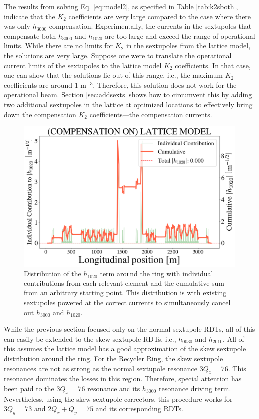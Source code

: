 The results from solving Eq. \ref{eq:model2}, as specified in Table \ref{tab:k2sboth}, indicate that the $K_2$ coefficients are very large compared to the case where there was only $h_{3000}$ compensation. Experimentally, the currents in the sextupoles that compensate both $h_{3000}$ and $h_{1020}$ are too large and exceed the range of operational limits. While there are no limits for $K_2$ in the sextupoles from the lattice model, the solutions are very large. Suppose one were to translate the operational current limits of the sextupoles to the lattice model $K_2$ coefficients. In that case, one can show that the solutions lie out of this range, i.e., the maximum $K_2$ coefficients are around 1 m$^{-3}$. Therefore, this solution does not work for the operational beam. Section \ref{sec:addsexts} shows how to circumvent this by adding two additional sextupoles in the lattice at optimized locations to effectively bring down the compensation $K_2$ coefficients---the compensation currents.

\begin{figure}[H]
    \centering
    \includegraphics[width=\columnwidth]{chapter4/old_config_h1020.png}
    \caption{Distribution of the $h_{1020}$ term around the ring with individual contributions from each relevant element and the cumulative sum from an arbitrary starting point. This distribution is with existing sextupoles powered at the correct currents to simultaneously cancel out $h_{3000}$ and $h_{1020}$.}
    \label{fig:h1020oldconfig}
\end{figure}

While the previous section focused only on the normal sextupole RDTs, all of this can easily be extended to the skew sextupole RDTs, i.e., $h_{0030}$ and $h_{2010}$. All of this assumes the lattice model has a good approximation of the skew sextupole distribution around the ring. For the Recycler Ring, the skew sextupole resonances are not as strong as the normal sextupole resonance $3Q_x=76$. This resonance dominates the losses in this region. Therefore, special attention has been paid to the $3Q_x=76$ resonance and its $h_{3000}$ resonance driving term. Nevertheless, using the skew sextupole correctors, this procedure works for $3Q_y=73$ and $2Q_x+Q_y=75$ and its corresponding RDTs.

